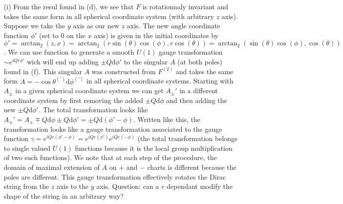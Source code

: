 \documentclass[10pt, a4paper]{article}
\begin{document}
{\begin{enumerate}
  \item[(i)] From the resul found in (d), we see that $F$ is rotationnaly invariant and takes the same form in all spherical coordinate system (with arbitrary $z$ axis). Suppose we take the $y$ axis as our new $z$ axis. The new angle coordinate function $\phi'$ (set to $0$ on the $x$ axis) is given in the initial coordinates by  $\phi' = \arctan_2(z, x) = \arctan_2(r \sin(\theta)\cos(\phi), r \cos(\theta)) = \arctan_2(\sin(\theta)\cos(\phi), \cos(\theta))$. We can use function to generate a smooth $U(1)$ gauge transformation $\sim e^{i Qe \phi'}$ wich will end up adding $\pm Q\text{d}\phi'$ to the singular $A$ (at both poles) found in (f). This singular $A$ was constructed from $F^(2)$ and takes the same form $A = -\cos\theta^{(')}\text{d}\phi^{(')}$ in all spherical coordinate systems. Starting with $A_\pm$ in a given spherical coordinate system we can get $A_{\pm}'$ in a different coordinate system by first removing the added $\pm Q\text{d}\phi$ and then adding the new $\pm Q \text{d}\phi'$. The total transformation looks like $A_\pm' = A_\pm \mp Q\text{d}\phi \pm Q\text{d}\phi' = \pm Q\text{d}(\phi'-\phi)$. Written like this, the transformation looks like a gauge transformation associated to the gauge function $\gamma = e^{i Qe (\phi'-\phi)} = e^{i Qe (\phi')} e^{i Qe (-\phi)}$ (the total transformation belongs to single valued $U(1)$ functions because it is the local group multiplication of two such functions). We note that at each step of the procedure, the domain of maximal extension of $A$ on $+$ and $-$ charts is different because the poles are different. This gauge transformation effectively rotates the Dirac string from the $z$ axis to the $y$ axis. Question: can a $r$ dependant modify the shape of the string in an arbitrary way?
\end{enumerate}

}
\end{document}
